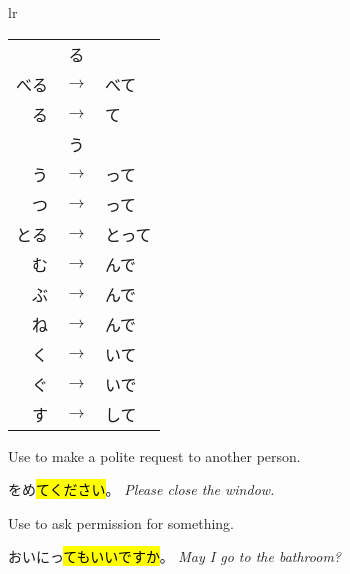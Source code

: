 {\begin{tabular}{lr}
\begin{minipage}[b]{0.45\linewidth}
        \begin{tabular}{|rcl|}
            \hline
                              & る            & \hspace{1mm} \\
            \ruby{食}{た}べる & $\rightarrow$ & \ruby{食}{た}べて \\
            \ruby{見}{み}る   & $\rightarrow$ & \ruby{見}{み}て \\
            \hline
                              & う            & \hspace{1mm} \\
            \ruby{会}{あ}う   & $\rightarrow$ & \ruby{合}{あ}って \\
            \ruby{待}{ま}つ   & $\rightarrow$ & \ruby{待}{ま}って \\
            とる              & $\rightarrow$ & とって \\
            \ruby{読}{よ}む   & $\rightarrow$ & \ruby{読}{よ}んで \\
            \ruby{遊}{あそ}ぶ & $\rightarrow$ & \ruby{遊}{あそ}んで \\
            \ruby{死}{し}ね   & $\rightarrow$ & \ruby{死}{し}んで \\
            \ruby{書}{か}く   & $\rightarrow$ & \ruby{書}{か}いて \\
            \ruby{泳}{およ}ぐ & $\rightarrow$ & \ruby{泳}{およ}いで \\
            \ruby{話}{はな}す & $\rightarrow$ & \ruby{話}{はな}して \\
            \hline
        \end{tabular}
        \end{minipage}
   \end{tabular} 
    }

    {
    Use to make a polite request to another person.
    
    \begin{center}
    \end{center}
    
    をめ\hl{てください}。
    \textit{Please close the window.}
    }

    {
    Use to ask permission for something.
    
    \begin{center}
    \end{center}

    おいにっ\hl{てもいいですか}。
    \textit{May I go to the bathroom?}
    }

